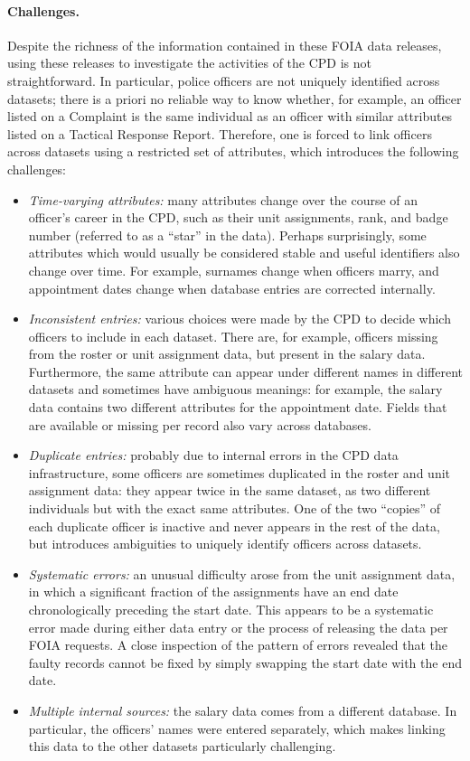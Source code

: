 \paragraph{Challenges.}
Despite the richness of the information contained in these FOIA data releases,
using these releases to investigate  the activities of the CPD is not straightforward. 
In particular, police officers are not uniquely identified across datasets; there is
a priori no reliable way to know whether, for example, an officer listed on
a Complaint is the same individual as an officer with similar attributes listed
on a Tactical Response Report. Therefore, one is forced to link officers
across datasets using a restricted set of attributes, 
which introduces the following challenges:
\begin{itemize}
	\item \emph{Time-varying attributes:} many attributes change over the
		course of an officer's career in the CPD, such as their unit
		assignments, rank, and badge number (referred to as a ``star'' in the data). 
                Perhaps surprisingly, some
		attributes which would usually be considered stable and useful
		identifiers also change over time. For example, surnames change when
		officers marry, and appointment dates change when database entries are
		corrected internally.
	\item \emph{Inconsistent entries:} various choices were made by the CPD to
		decide which officers to include in each dataset.  There are, for
		example, officers missing from the roster or unit assignment data, but
		present in the salary data. Furthermore, the same attribute can appear
		under different names in different datasets and sometimes have
		ambiguous meanings: for example, the salary data contains two different
		attributes for the appointment date. Fields that are available or missing
		per record also vary across databases.
	\item \emph{Duplicate entries:} probably due to internal errors in the CPD
		data infrastructure, some officers are sometimes duplicated in the
		roster and unit assignment data: they appear twice in the same dataset,
		as two different individuals but with the exact same attributes. One of
		the two “copies” of each duplicate officer is inactive and never
		appears in the rest of the data, but introduces ambiguities to uniquely
		identify officers across datasets.
	\item \emph{Systematic errors:} an unusual difficulty arose from the unit
		assignment data, in which a significant fraction of the assignments
		have an end date chronologically preceding the start date. This appears
		to be a systematic error made during either data entry or the process 
                of releasing the data per FOIA requests. A close inspection of the pattern of
		errors revealed that the faulty records cannot be fixed by simply
		swapping the start date with the end date.
	\item \emph{Multiple internal sources:} the salary data comes from
		a different database. In particular, the officers' names were entered
		separately, which makes linking this data to the other datasets
		particularly challenging.
\end{itemize}


